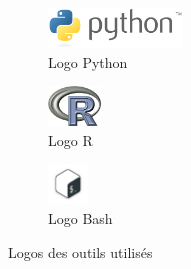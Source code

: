 		\begin{figure}[H]
			\begin{subfigure}[b]{.3\textwidth}
				\centering
				\includegraphics[height=40px]{ch2-images/python}
				\caption{Logo Python}
				\label{fig:python}
			\end{subfigure}
			\begin{subfigure}[b]{.3\textwidth}
					\centering
					\includegraphics[height=40px]{ch2-images/R}
					\caption{Logo R}
					\label{fig:R}
			\end{subfigure}
			\begin{subfigure}[b]{.3\textwidth}
					\centering
					\includegraphics[height=40px]{ch2-images/Bash}
					\caption{Logo Bash}
					\label{fig:bash}
			\end{subfigure}
			\caption{Logos des outils utilisés}
		\end{figure}
